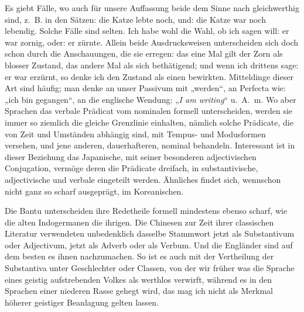  Es giebt Fälle, wo auch für unsere Auffassung beide dem Sinne nach gleichwerthig sind, z.~B. in den Sätzen: die Katze lebte noch, und: die Katze war noch lebendig. Solche Fälle sind selten. Ich habe wohl die Wahl, ob ich sagen will: er war zornig, oder: er zürnte. Allein beide Ausdrucksweisen unterscheiden sich doch schon durch die Anschauungen, die sie erregen: das eine Mal gilt der Zorn \label{fp.419} als blosser Zustand, das andere Mal als sich bethätigend; und wenn ich drittens sage: er war erzürnt, so denke ich den Zustand als einen bewirkten. Mitteldinge dieser Art sind häufig; man denke an unser Passivum mit „werden“, an Perfecta wie: „ich bin gegangen“, an die englische Wendung: „\textit{I am writing}“ u.~A.~m. Wo aber Sprachen das verbale Prädicat vom nominalen formell unterscheiden, werden sie immer so ziemlich die gleiche Grenzlinie einhalten, nämlich solche Prädicate, die  \label{sp.440} von Zeit und Umständen abhängig sind, mit Tempus- und Modusformen versehen, und jene anderen, dauerhafteren, nominal behandeln. Interessant ist in dieser Beziehung das Japanische, mit seiner besonderen adjectivischen Conjugation, vermöge deren die Prädicate dreifach, in substantivische, adjectivische und verbale eingeteilt werden. Ähnliches findet sich, wennschon nicht ganz so scharf ausgeprägt, im Koreanischen.

Die Bantu unterscheiden ihre Redetheile formell mindestens ebenso scharf, wie die alten Indogermanen die ihrigen. Die Chinesen zur Zeit ihrer classischen Literatur verwendeten unbedenklich dasselbe Stammwort jetzt als Substantivum oder Adjectivum, jetzt als Adverb oder als Verbum. Und die Engländer sind auf dem besten  es ihnen nachzumachen. So ist es auch mit der Vertheilung der Substantiva unter Geschlechter oder Classen, von der wir früher  was die Sprache eines geistig aufstrebenden Volkes als werthlos verwirft, während es in den Sprachen einer niederen Rasse gehegt wird, das mag ich nicht als Merkmal höherer geistiger Beanlagung gelten lassen.

